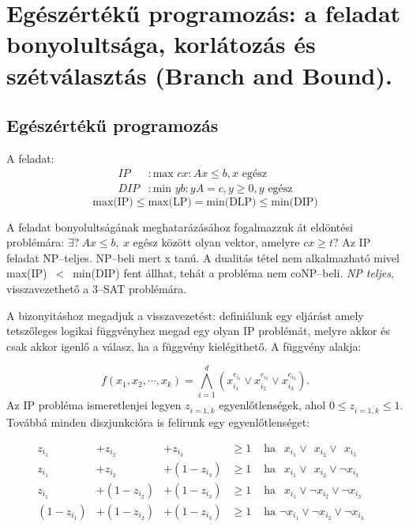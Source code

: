 \newpage
\section{Egészértékű programozás: a feladat bonyolultsága, korlátozás és szétválasztás (Branch and Bound).}

\subsection{Egészértékű programozás}
A feladat:
\begin{align*}
IP &: \mbox{max }{cx: Ax \leq b, x \mbox{ egész}} \\
DIP &: \mbox{min }{yb: yA=c, y \geq 0, y \mbox{ egész}}
\end{align*}
\[ \mbox{max(IP)} \leq \mbox{max(LP)}= \mbox{min(DLP)} \leq \mbox{min(DIP)} \]

A feladat bonyolultságának meghatarázásához fogalmazzuk át eldöntési problémára:
$\exists?~Ax \leq b,~ x$ egész között olyan vektor, amelyre $cx \geq t?$ Az IP
feladat NP--teljes. NP--beli mert x tanú. A dualitás tétel nem alkalmazható
mivel max(IP)~$<$~min(DIP) fent állhat, tehát a probléma nem coNP--beli. \emph{NP
teljes}, visszavezethető a $3$--SAT problémára.

A bizonyitáshoz megadjuk a visszavezetést: definiálunk egy eljárást amely tetszőleges
logikai függvényhez megad egy olyan IP problémát, melyre akkor és csak akkor igenlő a
válasz, ha a függvény kielégithető. A függvény alakja:

\[ f(x_1, x_2, \cdots, x_k) = \bigwedge_{i=1}^{d}{\left( x_{i_1}^{e_{i_1}} \vee 
x_{i_2}^{e_{i_2}} \vee x_{i_3}^{e_{i_3}}\right).} 
\]
Az IP probléma ismeretlenjei legyen $z_{i=\overline{1,k}}$ egyenlőtlenségek, ahol 
$0 \leq z_{i=\overline{1,k}} \leq 1$. Továbbá minden diszjunkcióra is felirunk egy
egyenlőtlenséget:


\begin{align*}
z_{i_1} &+ z_{i_2} &+      z_{i_3}  &\geq 1 & \mbox{ ha }~~x_{i_1} \vee~~x_{i_2}\vee~~x_{i_3}& \\
z_{i_1} &+ z_{i_2} &+ (1 - z_{i_3}) &\geq 1 & \mbox{ ha }~~x_{i_1} \vee~~x_{i_2} \vee \neg x_{i_3}& \\
z_{i_1} &+ (1-z_{i_2}) &+ (1 - z_{i_3})  &\geq 1 & \mbox{ ha }~~x_{i_1} \vee \neg x_{i_2} \vee\neg x_{i_3}&\\
(1-z_{i_1}) &+ (1-z_{i_2}) &+ (1 - z_{i_3})  &\geq 1 & \mbox{ ha } \neg x_{i_1} \vee \neg x_{i_2} \vee \neg x_{i_3}&
\end{align*}

